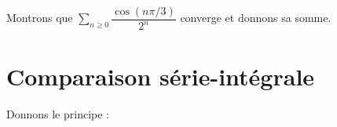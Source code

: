 \documentclass[french,11pt,twoside]{VcCours}
\newcommand{\dx}{\text{d}x}
\newcommand{\Sum}[2]{\ensuremath{\textstyle{\sum\limits_{#1}^{#2}}}}
\begin{document}
\begin{ex} Montrons que $\Sum{n \geq 0}{} \dfrac{\cos(n \pi/3)}{2^n}$ converge et donnons sa somme.

\vspace{9.5cm}
\end{ex}

\section{Comparaison série-intégrale}

Donnons le principe :

%
%
%
%
%
%
\end{document}
